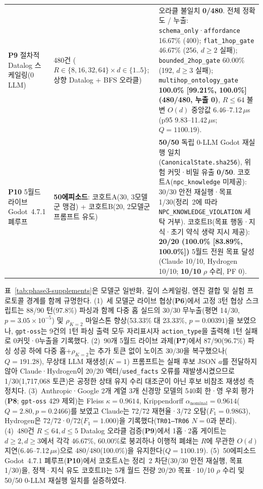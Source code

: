 \begin{table}[!tbp]
\begin{tabularx}{\textwidth}{@{}>{\raggedright\arraybackslash}p{}>{\raggedright\arraybackslash}p{}>{\raggedright\arraybackslash}X@{}}
\textbf{P9} 절차적 Datalog 스케일링(0 LLM) & 480건 ($R{\in}\{8,16,32,64\} \times d{\in}\{1..5\}$; 상향 Datalog + BFS 오라클) & 오라클 불일치 \textbf{0/480}. 전체 정확도 / 누출: \texttt{schema\_only}·\texttt{affordance} 16.67\% (400); \texttt{flat\_}\allowbreak\texttt{1hop\_}\allowbreak\texttt{gate} 46.67\% (256, $d{\ge}2$ 실패); \texttt{bounded\_}\allowbreak\texttt{2hop\_}\allowbreak\texttt{gate} 60.00\% (192, $d{\ge}3$ 실패); \texttt{multihop\_}\allowbreak\texttt{ontology\_}\allowbreak\texttt{gate} \textbf{100.0\% [99.21\%, 100.0\%] (480/480, 누출 0)}, $R{\le}64$ 불변 $O(d)$ 중앙값 6.46--7.12\,$\mu$s (p95 9.83--11.42\,$\mu$s; $Q{=}1100.19$). \\
\textbf{P10} 5월드 라이브 Godot~4.7.1 폐루프 & \textbf{50에피소드}: 코호트A(30, 3모델군 맹검) + 코호트B(20, 2모델군 프롬프트 유도) & \textbf{50/50} 독립 0-LLM Godot 재실행 일치(\texttt{CanonicalState.sha256}), 위험 커밋·비밀 유출 \textbf{0/50}. 코호트A(\texttt{npc\_knowledge} 미제공): 30/30 안전 재실행·목표 1/30(정리~2에 따라 \texttt{NPC\_}\allowbreak\texttt{KNOWLEDGE\_}\allowbreak\texttt{VIOLATION} 세탁 거부). 코호트B(목표 행동·지식·초기 약식 생략 지시 제공): \textbf{20/20 (100.0\% [83.89\%, 100.0\%])} 5월드 전원 목표 달성(Claude 10/10, Hydrogen 10/10; \textbf{10/10} $\rho$ 수리, PF 0). \\
\bottomrule
\end{tabularx}
\end{table}

표~\ref{tab:phase3-supplements}은 모델군 일반화, 깊이 스케일링, 엔진 결합 및 실험 프로토콜 경계를 함께 규명한다.
(1)~세 모델군 라이브 협상(\textbf{P6})에서 고정 3턴 협상 스크립트는 88/90 턴(97.8\%) 파싱과 함께 다중 홉 실드의 30/30 무누출(평면 14/30, $p{=}3.05{\times}10^{-5}$) 및 $\rho_{K=2}$ 마일스톤 향상(53.33\% 대 23.33\%, $p{=}0.00391$)을 보였으나, \texttt{gpt-oss}는 9건의 1턴 파싱 출력 모두 자리표시자 \texttt{action\_type}을 출력해 1턴 실패로 0커밋·0누출을 기록했다.
(2)~90개 5월드 라이브 과제(\textbf{P7})에서 87/90(96.7\%) 파싱 성공 하에 다중 홉+$\rho_{K=2}$는 추가 토큰 없이 노이즈 30/30을 복구했으나($Q{=}191.28$), 무상태 LLM 재생성($K{=}1$) 프롬프트는 실패 후보 JSON $a$를 전달하지 않아 Claude·Hydrogen이 20/20 액터/\texttt{used\_facts} 오류를 재발생시켰으므로 1/30(1,717,068 토큰)은 공정한 상태 유지 수리 대조군이 아닌 후보 비참조 재생성 측정치다.
(3)~Anthropic·Google 2개 계열 3개 신경망 모델의 540회 한·영 우회 평가(\textbf{P8}; \texttt{gpt-oss} 429 제외)는 Fleiss $\kappa{=}0.9614$, Krippendorff $\alpha_{\mathrm{nominal}}{=}0.9614$($Q{=}2.80, p{=}0.2466$)를 보였고 Claude는 72/72 재현율·3/72 오탐($F_1{=}0.9863$), Hydrogen은 72/72·0/72($F_1{=}1.000$)을 기록했다(\texttt{TR01--TR06} $N{=}0$과 분리).
(4)~480건 $R{\le}64, d{\le}5$ Datalog 오라클 검증(\textbf{P9})에서 1홉·2홉 게이트는 $d{\ge}2, d{\ge}3$에서 각각 46.67\%, 60.00\%로 붕괴하나 이행적 폐쇄는 $R$에 무관한 $O(d)$ 지연(6.46--7.12\,$\mu$s)으로 480/480(100.0\%)을 유지한다($Q{=}1100.19$).
(5)~50에피소드 Godot~4.7.1 폐루프(\textbf{P10})에서 코호트A는 정리~2 차단(30/30 안전 재실행, 목표 1/30)을, 정책·지식 유도 코호트B는 5개 월드 전량 20/20 목표·10/10 $\rho$ 수리 및 50/50 0-LLM 재실행 일치를 실증하였다.
